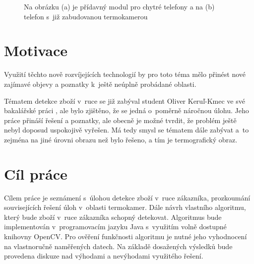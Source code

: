 \begin{introduction}
\begin{figure}
    \qquad
    \caption{Na obrázku (a) je přídavný modul pro chytré telefony a na (b) telefon s~již zabudovanou termokamerou}
    \label{fig:example}
\end{figure}

	\section{Motivace}
	Využití těchto nově rozvíjejících technologií by pro toto téma mělo přinést nové zajímavé objevy a poznatky k~ještě neúplně probádané oblasti. 
    
    Tématem detekce zboží v~ruce se již zabýval student Oliver Keruľ-Kmec ve své bakalářské práci \cite{kerul2016detekce}, ale bylo zjištěno, že se jedná o~poměrně náročnou úlohu. Jeho práce přináší řešení a poznatky, ale obecně je možné tvrdit, že problém ještě nebyl doposud uspokojivě vyřešen. Má tedy smysl se tématem dále zabývat a~to zejména na jiné úrovni obrazu než bylo řešeno, a tím je termografický obraz.
	
	\section{Cíl práce}
    Cílem práce je seznámení s~úlohou detekce zboží v~ruce zákazníka, prozkoumání souvisejících řešení úloh v~oblasti termokamer. Dále návrh vlastního algoritmu, který bude zboží v~ruce zákazníka schopný detekovat. Algoritmus bude implementován v~programovacím jazyku Java s~využitím volně dostupné knihovny OpenCV. Pro ověření funkčnosti algoritmu je nutné jeho vyhodnocení na vlastnoručně naměřených datech. Na základě dosažených výsledků bude provedena diskuze nad výhodami a nevýhodami využitého řešení.
    

\end{introduction}
